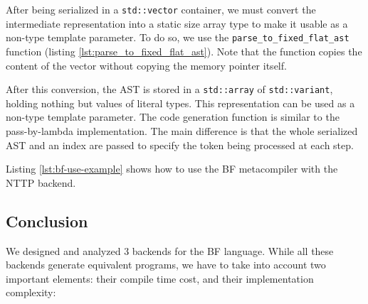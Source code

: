 \documentclass[../../main.tex]{subfiles}
\begin{document}
After being serialized in a \lstinline|std::vector| container, we must convert
the intermediate representation into a static size array type to make it usable
as a non-type template parameter. To do so, we use the
\lstinline|parse_to_fixed_flat_ast| function
(listing \ref{lst:parse_to_fixed_flat_ast}). Note that the function copies the content of
the vector without copying the memory pointer itself.



After this conversion, the AST is stored in a \lstinline|std::array| of
\lstinline|std::variant|, holding nothing but values of literal types. This
representation can be used as a non-type template parameter. The code
generation function is similar to the pass-by-lambda implementation. The main
difference is that the whole serialized AST and an index are passed to specify
the token being processed at each step.

Listing \ref{lst:bf-use-example} shows how to use the BF metacompiler with the
NTTP backend.

\subsection{Conclusion}

We designed and analyzed 3 backends for the BF language. While all these
backends generate equivalent programs, we have to take into account two
important elements: their compile time cost, and their implementation
complexity:
\end{document}
